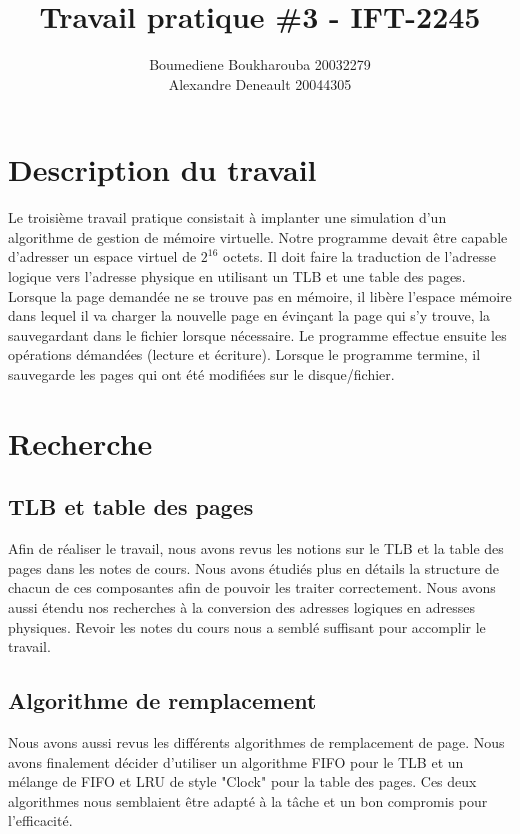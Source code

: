 \documentclass{article}
\title{Travail pratique \#3 - IFT-2245}
\author{Boumediene Boukharouba
20032279\\
Alexandre Deneault
20044305}
\begin{document}
\maketitle

\section{Description du travail}

Le troisième travail pratique consistait à implanter une simulation d'un 
algorithme de gestion de mémoire virtuelle. Notre programme devait être 
capable d'adresser un espace virtuel de $ 2^{16}$ octets. Il doit faire la 
traduction de l'adresse logique vers l'adresse physique en utilisant un TLB et 
une table des pages. Lorsque la page demandée ne se trouve pas en mémoire, il 
libère l'espace mémoire dans lequel il va charger la nouvelle page en évinçant 
la page qui s'y trouve, la sauvegardant dans le fichier lorsque nécessaire. Le 
programme effectue ensuite les opérations démandées (lecture et écriture). 
Lorsque le programme termine, il sauvegarde les pages qui ont été modifiées 
sur le disque/fichier.


\section{Recherche}

\subsection{TLB et table des pages}

Afin de réaliser le travail, nous avons revus les notions sur le TLB et la 
table des pages dans les notes de cours. Nous avons étudiés plus en détails la 
structure de chacun de ces composantes afin de pouvoir les traiter 
correctement. Nous avons aussi étendu nos recherches à la conversion des 
adresses logiques en adresses physiques. Revoir les notes du cours nous a 
semblé suffisant pour accomplir le travail.

\subsection{Algorithme de remplacement}

Nous avons aussi revus les différents algorithmes de remplacement de page. 
Nous avons finalement décider d'utiliser un algorithme FIFO pour le TLB et un 
mélange de FIFO et LRU de style "Clock" pour la table des pages. Ces deux 
algorithmes nous semblaient être adapté à la tâche et un bon compromis pour 
l'efficacité. 
\end{document}
